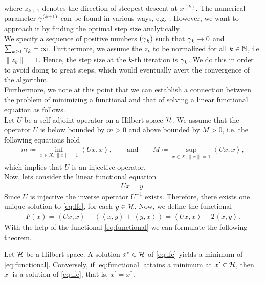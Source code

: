 where $z_{k+1}$ denotes the direction of steepest descent at $x^{(k)}$. The numerical parameter $\operatorname{\gamma}^{(k+1)}$ can be found in various ways, e.g. \cite[Chapter~XV]{kantorovich2016functional}. However, we want to approach it by finding the optimal step size analytically.\\
We specify a sequence of positive numbers $(\operatorname{\gamma}_k)$ such that $\operatorname{\gamma}_k \to 0$ and $\sum_{k\geq 1} \operatorname{\gamma}_k = \infty$. Furthermore, we assume the $z_k$ to be normalized for all $k\in \operatorname{\mathbb{N}}$, i.e. $\|z_k\| = 1$. Hence, the step size at the $k$-th iteration is $\operatorname{\gamma}_k$. We do this in order to avoid doing to great steps, which would eventually avert the convergence of the algorithm.\\
Furthermore, we note at this point that we can establish a connection between the problem of minimizing a functional and that of solving a linear functional equation as follows.\\
Let $U$ be a self-adjoint operator on a Hilbert space $\mathcal{H}$. We assume that the operator $U$ is below bounded by $m>0$ and above bounded by $M>0$, i.e. the following equations hold
\begin{align*}
m \coloneqq \inf_{x\in X, \|x\| = 1} \left\langle Ux, x \right\rangle, \qquad \text{and} \qquad M \coloneqq \sup_{x\in X, \|x\| = 1} \left\langle Ux, x \right\rangle,
\end{align*}
which implies that $U$ is an injective operator.\\
Now, lets consider the linear functional equation
\begin{align}\label{eq:lfe}
Ux = y.
\end{align}
Since $U$ is injective the inverse operator $U^{-1}$ exists. Therefore, there exists one unique solution to \eqref{eq:lfe}, for each $y\in\mathcal{H}$. Now, we define the functional
\begin{align}\label{eq:functional}
F(x) = \left\langle Ux, x\right\rangle - \left( \left\langle x, y\right\rangle + \left\langle y, x\right\rangle \right) = \left\langle Ux, x\right\rangle - 2 \left\langle x, y\right\rangle.
\end{align}
With the help of the functional \eqref{eq:functional} we can formulate the following theorem.

\begin{theorem}\label{theorem:min_lfe}
Let $\mathcal{H}$ be a Hilbert space. A solution $x^{\ast}\in \mathcal{H}$ of \eqref{eq:lfe} yields a minimum of \eqref{eq:functional}. Conversely, if \eqref{eq:functional} attains a minimum at $x^{\prime} \in \mathcal{H}$, then $x^{\prime}$ is a solution of \eqref{eq:lfe}, that is, $x^{\prime} = x^{\ast}$.
\end{theorem}

